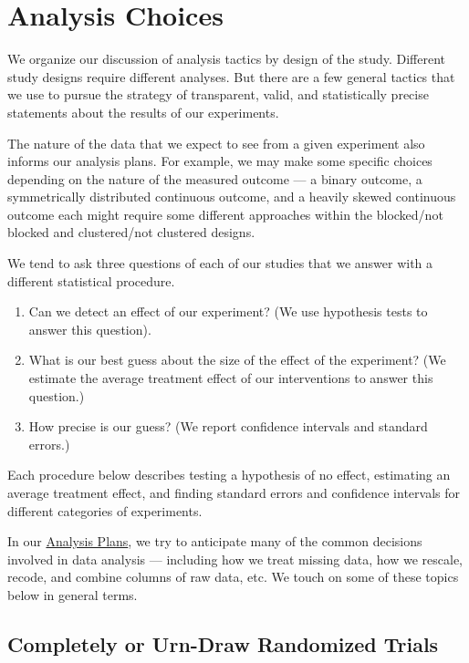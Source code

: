 \documentclass[
  12pt,
]{book}
\providecommand{\tightlist}{%
  \setlength{\itemsep}{0pt}\setlength{\parskip}{0pt}}
\theoremstyle{definition}
\theoremstyle{definition}
\theoremstyle{definition}
\theoremstyle{remark}
\begin{document}
\hypertarget{analysis-choices}{%
\chapter{Analysis Choices}\label{analysis-choices}}

We organize our discussion of analysis tactics by design of the study.
Different study designs require different analyses. But there are a few
general tactics that we use to pursue the strategy of transparent,
valid, and statistically precise statements about the results of our
experiments.

The nature of the data that we expect to see from a given experiment
also informs our analysis plans. For example, we may make some specific
choices depending on the nature of the measured outcome --- a binary
outcome, a symmetrically distributed continuous outcome, and a heavily
skewed continuous outcome each might require some different approaches
within the blocked/not blocked and clustered/not clustered designs.

We tend to ask three questions of each of our studies that we answer
with a different statistical procedure.

\begin{enumerate}
\def\labelenumi{\arabic{enumi}.}
\tightlist
\item
  Can we detect an effect of our experiment? (We use hypothesis tests to
  answer this question).
\item
  What is our best guess about the size of the effect of the experiment?
  (We estimate the average treatment effect of our interventions to
  answer this question.)
\item
  How precise is our guess? (We report confidence intervals and standard
  errors.)
\end{enumerate}

Each procedure below describes testing a hypothesis of no effect,
estimating an average treatment effect, and finding standard errors and
confidence intervals for different categories of experiments.

In our
\href{https://oes.gsa.gov/methodsdetail/\#analysis-plans}{Analysis
Plans}, we try to anticipate many of the common decisions involved in
data analysis --- including how we treat missing data, how we rescale,
recode, and combine columns of raw data, etc. We touch on some of these
topics below in general terms.

\hypertarget{completely-or-urn-draw-randomized-trials}{%
\section{Completely or Urn-Draw Randomized
Trials}\label{completely-or-urn-draw-randomized-trials}}
\end{document}
